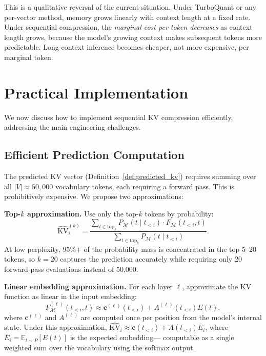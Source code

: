 \documentclass[11pt]{article}
\begin{document}
This is a qualitative reversal of the current situation.  Under TurboQuant or any
per-vector method, memory grows linearly with context length at a fixed rate.
Under sequential compression, the \emph{marginal cost per token decreases} as
context length grows, because the model's growing context makes subsequent tokens
more predictable.  Long-context inference becomes cheaper, not more expensive,
per marginal token.

\section{Practical Implementation}
\label{sec:practical}

We now discuss how to implement sequential KV compression efficiently, addressing
the main engineering challenges.

\subsection{Efficient Prediction Computation}

The predicted KV vector (Definition~\ref{def:predicted_kv}) requires summing
over all $|V| \approx 50{,}000$ vocabulary tokens, each requiring a forward pass.
This is prohibitively expensive.  We propose two approximations:

\textbf{Top-$k$ approximation.} Use only the top-$k$ tokens by probability:
\[
  \widehat{\mathrm{KV}}_i^{(k)} = \frac{\sum_{t \in \mathrm{top}_k} P_{\mathcal{M}}(t \mid t_{<i}) \cdot F_{\mathcal{M}}(t_{<i}, t)}
                                         {\sum_{t \in \mathrm{top}_k} P_{\mathcal{M}}(t \mid t_{<i})}.
\]
At low perplexity, 95\%+ of the probability mass is concentrated in the top 5--20
tokens, so $k = 20$ captures the prediction accurately while requiring only 20
forward pass evaluations instead of 50,000.

\textbf{Linear embedding approximation.}  For each layer $\ell$, approximate the
KV function as linear in the input embedding:
\[
  F_{\mathcal{M}}^{(\ell)}(t_{<i}, t) \approx \mathbf{c}^{(\ell)}(t_{<i}) + A^{(\ell)}(t_{<i}) E(t),
\]
where $\mathbf{c}^{(\ell)}$ and $A^{(\ell)}$ are computed once per position from
the model's internal state.  Under this approximation,
$\widehat{\mathrm{KV}}_i \approx \mathbf{c}(t_{<i}) + A(t_{<i}) \bar{E}_i$,
where $\bar{E}_i = \mathbb{E}_{t \sim P}[E(t)]$ is the expected embedding---
computable as a single weighted sum over the vocabulary using the softmax output.
\end{document}
